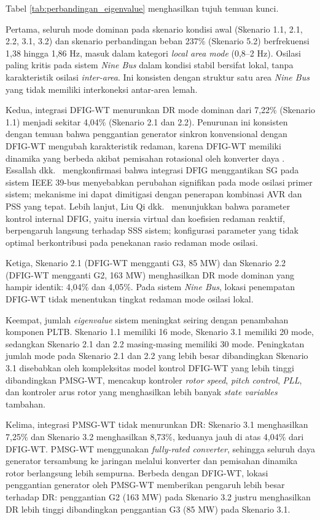 Tabel \ref{tab:perbandingan_eigenvalue} menghasilkan tujuh temuan kunci.

Pertama, seluruh mode dominan pada skenario kondisi awal (Skenario 1.1, 2.1,
2.2, 3.1, 3.2) dan skenario perbandingan beban 237\% (Skenario 5.2) berfrekuensi
1,38 hingga 1,86 Hz, masuk dalam kategori \textit{local area mode} (0,8--2 Hz).
Osilasi paling kritis pada sistem \textit{Nine Bus} dalam kondisi stabil bersifat
lokal, tanpa karakteristik osilasi \textit{inter-area}. Ini konsisten dengan
struktur satu area \textit{Nine Bus} yang tidak memiliki interkoneksi antar-area
lemah.

Kedua, integrasi DFIG-WT menurunkan DR mode dominan dari 7,22\% (Skenario 1.1)
menjadi sekitar 4,04\% (Skenario 2.1 dan 2.2). Penurunan ini konsisten dengan
temuan bahwa penggantian generator sinkron konvensional dengan DFIG-WT mengubah
karakteristik redaman, karena DFIG-WT memiliki dinamika yang berbeda akibat
pemisahan rotasional oleh konverter daya \cite{mehta2014,essallah2019}. Essallah
dkk.\ \cite{essallah2019} mengkonfirmasi bahwa integrasi DFIG menggantikan SG
pada sistem IEEE 39-bus menyebabkan perubahan signifikan pada mode osilasi primer
sistem; mekanisme ini dapat dimitigasi dengan penerapan kombinasi AVR dan PSS yang
tepat. Lebih lanjut, Liu Qi dkk.\ \cite{liuqi2023} menunjukkan bahwa parameter
kontrol internal DFIG, yaitu inersia virtual dan koefisien redaman reaktif,
berpengaruh langsung terhadap SSS sistem; konfigurasi parameter yang tidak optimal
berkontribusi pada penekanan rasio redaman mode osilasi.

Ketiga, Skenario 2.1 (DFIG-WT mengganti G3, 85 MW) dan Skenario 2.2 (DFIG-WT
mengganti G2, 163 MW) menghasilkan DR mode dominan yang hampir identik: 4,04\%
dan 4,05\%. Pada sistem \textit{Nine Bus}, lokasi penempatan DFIG-WT tidak
menentukan tingkat redaman mode osilasi lokal.

Keempat, jumlah \textit{eigenvalue} sistem meningkat seiring dengan penambahan
komponen PLTB. Skenario 1.1 memiliki 16 mode, Skenario 3.1 memiliki 20 mode,
sedangkan Skenario 2.1 dan 2.2 masing-masing memiliki 30 mode. Peningkatan
jumlah mode pada Skenario 2.1 dan 2.2 yang lebih besar dibandingkan Skenario 3.1
disebabkan oleh kompleksitas model kontrol DFIG-WT yang lebih tinggi
dibandingkan PMSG-WT, mencakup kontroler \textit{rotor speed}, \textit{pitch
control}, \textit{PLL}, dan kontroler arus rotor yang menghasilkan lebih banyak
\textit{state variables} tambahan.

Kelima, integrasi PMSG-WT tidak menurunkan DR: Skenario 3.1 menghasilkan 7,25\%
dan Skenario 3.2 menghasilkan 8,73\%, keduanya jauh di atas 4,04\% dari DFIG-WT.
PMSG-WT menggunakan \textit{fully-rated converter}, sehingga seluruh daya
generator tersambung ke jaringan melalui konverter dan pemisahan dinamika rotor
berlangsung lebih sempurna. Berbeda dengan DFIG-WT, lokasi penggantian generator
oleh PMSG-WT memberikan pengaruh lebih besar terhadap DR: penggantian G2 (163 MW)
pada Skenario 3.2 justru menghasilkan DR lebih tinggi dibandingkan penggantian G3
(85 MW) pada Skenario 3.1.

